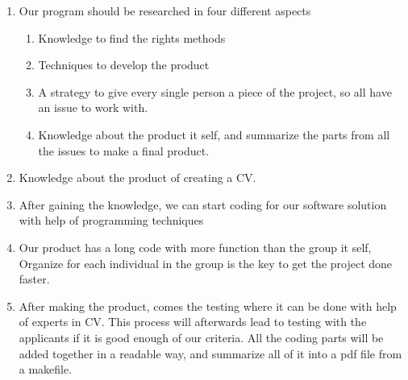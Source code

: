 \begin{enumerate}
  \item Our program should be researched in four different aspects 
  \begin{enumerate}
    \item Knowledge to find the rights methods 
    \item Techniques to develop the product
    \item A strategy to give every single person a piece of the project, so all have an issue to work with.
    \item Knowledge about the product it self, and summarize the parts from all the issues to make a final product.
  \end{enumerate}
  \item Knowledge about the product of creating a CV.
  \item After gaining the knowledge,
        we can start coding for our software solution with help of programming techniques
  \item Our product has a long code with more function than the group it self, 
        Organize for each individual in the group is the key to get the project done faster.
  \item After making the product, comes the testing where it can be done with help of experts in CV.
        This process will afterwards lead to testing with the applicants if it is good enough of our criteria.
        All the coding parts will be added together in a readable way, and summarize all of it into a pdf file from a makefile.
\end{enumerate}